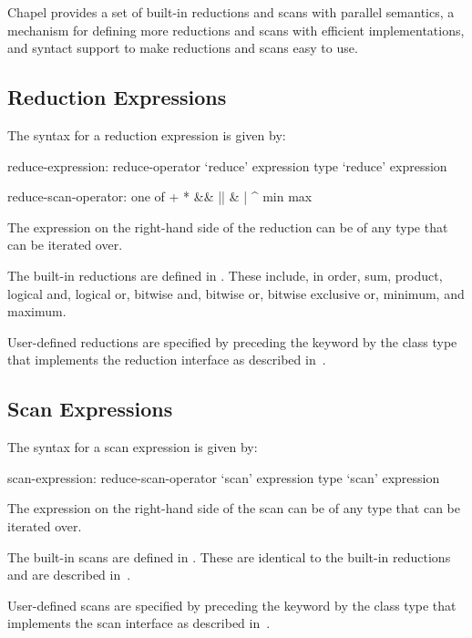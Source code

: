 \label{Reductions_and_Scans}

Chapel provides a set of built-in reductions and scans with parallel
semantics, a mechanism for defining more reductions and scans with
efficient implementations, and syntact support to make reductions and
scans easy to use.

\subsection{Reduction Expressions}
\label{reduce}

The syntax for a reduction expression is given by:
\begin{syntax}
reduce-expression:
  reduce-operator `reduce' expression
  type `reduce' expression

reduce-scan-operator: one of
  + * && || & | ^ min max
\end{syntax}

The expression on the right-hand side of the reduction can be of any
type that can be iterated over.

The built-in reductions are defined in .  These
include, in order, sum, product, logical and, logical or, bitwise and,
bitwise or, bitwise exclusive or, minimum, and maximum.

User-defined reductions are specified by preceding the
keyword  by the class type that implements the reduction
interface as described in~.

\subsection{Scan Expressions}
\label{scan}

The syntax for a scan expression is given by:
\begin{syntax}
scan-expression:
  reduce-scan-operator `scan' expression
  type `scan' expression
\end{syntax}

The expression on the right-hand side of the scan can be of any
type that can be iterated over.

The built-in scans are defined in .  These
are identical to the built-in reductions and are described
in~.

User-defined scans are specified by preceding the keyword 
by the class type that implements the scan interface as described
in~.

